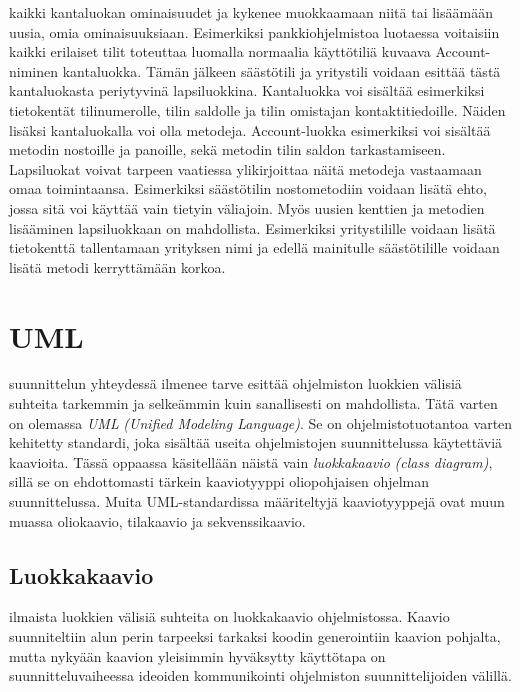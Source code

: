 \documentclass{tufte-book}
\newcommand{\eng}[1]{\textit{(#1)}}
\newcommand{\new}[1]{\textit{\gls{#1}}}
\newcommand{\neweng}[2]{\new{#1} \eng{#2}}
\begin{document}
 kaikki kantaluokan ominaisuudet ja kykenee muokkaamaan niitä tai
lisäämään uusia, omia ominaisuuksiaan. Esimerkiksi pankkiohjelmistoa luotaessa voitaisiin kaikki
erilaiset tilit toteuttaa luomalla normaalia käyttötiliä kuvaava Account-niminen kantaluokka.
Tämän jälkeen säästötili ja yritystili voidaan esittää tästä kantaluokasta periytyvinä
lapsiluokkina. Kantaluokka voi sisältää esimerkiksi tietokentät tilinumerolle, tilin saldolle ja
tilin omistajan kontaktitiedoille. Näiden lisäksi kantaluokalla voi olla metodeja. Account-luokka
esimerkiksi voi sisältää metodin nostoille ja panoille, sekä metodin tilin saldon tarkastamiseen.
Lapsiluokat voivat tarpeen vaatiessa ylikirjoittaa näitä metodeja vastaamaan omaa toimintaansa.
Esimerkiksi säästötilin nostometodiin voidaan lisätä ehto, jossa sitä voi käyttää vain tietyin
väliajoin. Myös uusien kenttien ja metodien lisääminen lapsiluokkaan on mahdollista. Esimerkiksi
yritystilille voidaan lisätä tietokenttä tallentamaan yrityksen nimi ja edellä mainitulle
säästötilille voidaan lisätä metodi kerryttämään korkoa.


\section{UML}
\label{paskaa}

 suunnittelun yhteydessä ilmenee tarve esittää ohjelmiston
luokkien välisiä suhteita tarkemmin ja selkeämmin kuin sanallisesti on mahdollista. Tätä varten on
olemassa \neweng{UML}{Unified Modeling Language}. Se on ohjelmistotuotantoa varten kehitetty
standardi, joka sisältää useita ohjelmistojen suunnittelussa käytettäviä kaavioita. Tässä oppaassa
käsitellään näistä vain \neweng{luokkakaavio}{class diagram}, sillä se on ehdottomasti tärkein
kaaviotyyppi oliopohjaisen ohjelman suunnittelussa. Muita UML-standardissa määriteltyjä
kaaviotyyppejä ovat muun muassa oliokaavio, tilakaavio ja sekvenssikaavio.

\subsection{Luokkakaavio}
\label{luokkakaavio}

 ilmaista luokkien välisiä suhteita on \gls{luokkakaavio}
ohjelmistossa. Kaavio suunniteltiin alun perin tarpeeksi tarkaksi koodin generointiin kaavion
pohjalta, mutta nykyään kaavion yleisimmin hyväksytty käyttötapa on suunnitteluvaiheessa ideoiden
kommunikointi ohjelmiston suunnittelijoiden välillä.
\end{document}
